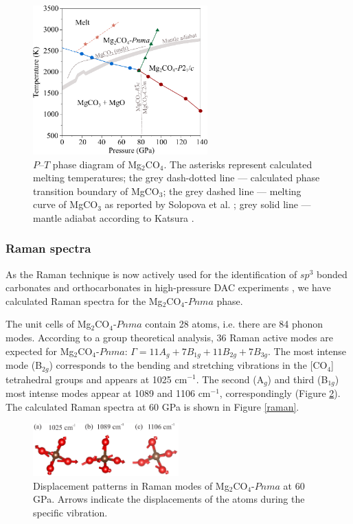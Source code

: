 \documentclass[a4paperm]{article}
\begin{document}
\begin{figure}[H]
	\centering
	\includegraphics[width=0.6\textwidth]{phdia_mg2co4}
	\caption{$P$--$T$ phase diagram of Mg$_2$CO$_4$. The asterisks represent calculated melting temperatures;  the grey dash-dotted line --- calculated phase transition boundary of MgCO$_3$; the grey dashed line --- melting curve of MgCO$_3$ as reported by Solopova et al. \cite{solopova2015}; grey solid line --- mantle adiabat according to Katsura \cite{katsura2010}.} 
\label{phdia}
\end{figure}


\subsubsection*{Raman spectra}

As the Raman technique is now actively used for the identification of $sp^3$ bonded carbonates and orthocarbonates in high-pressure DAC experiments \cite{lobanov2017, binck2020_mgco3}, we have calculated Raman spectra for the Mg$_2$CO$_4$-$Pnma$ phase.

The unit cells of Mg$_2$CO$_4$-$Pnma$ contain 28 atoms, i.e. there are 84 phonon modes. 
According to a group theoretical analysis, 36 Raman active modes are expected for Mg$_2$CO$_4$-$Pnma$: $\Gamma = 11A_g + 7B_{1g} + 11B_{2g} + 7B_{3g}$. 
The most intense mode (B$_{2g}$) corresponds to the bending and stretching vibrations in the [CO$_4$] tetrahedral groups and appears at 1025 cm$^{-1}$. 
The second (A$_g$) and third (B$_{1g}$) most intense modes appear at 1089 and 1106 cm$^{-1}$, correspondingly (Figure \ref{displ}). The calculated Raman spectra at 60 GPa is shown in Figure \ref{raman}.

\begin{figure}[H]
	\includegraphics[width=0.5\textwidth]{dis_pat} \centering
	\caption{Displacement patterns in Raman modes of Mg$_2$CO$_4$-$Pnma$ at 60 GPa. Arrows indicate the displacements of the atoms during the specific vibration.} \label{displ}
\end{figure}
\end{document}
